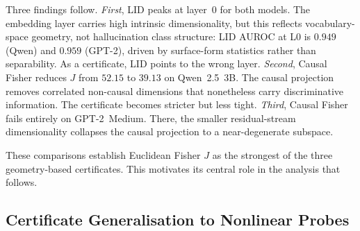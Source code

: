 \documentclass[10pt,twocolumn]{article}
\begin{document}
\begin{table}[!htbp]
\centering
\caption{Competing geometric certificates (Exp.~01). LID peaks at the
  embedding layer (L0) for both models, indicating that intrinsic
  dimensionality does not locate separability structure.
  Causal Fisher reduces $J$ by $25\%$ on Qwen and fails entirely on
  GPT-2~Medium.}
\label{tab:competing}
\small
\setlength{\tabcolsep}{3pt}
\end{table}

Three findings follow.
\textit{First}, LID peaks at layer~0 for both models. The embedding
layer carries high intrinsic dimensionality, but this reflects
vocabulary-space geometry, not hallucination class structure: LID AUROC
at L0 is $0.949$ (Qwen) and $0.959$ (GPT-2), driven by surface-form
statistics rather than separability. As a certificate, LID points to the
wrong layer.
\textit{Second}, Causal Fisher reduces $J$ from $52.15$ to $39.13$ on
Qwen~2.5~3B. The causal projection removes correlated non-causal
dimensions that nonetheless carry discriminative information. The
certificate becomes stricter but less tight.
\textit{Third}, Causal Fisher fails entirely on GPT-2~Medium. There, the
smaller residual-stream dimensionality collapses the causal projection
to a near-degenerate subspace.

These comparisons establish Euclidean Fisher $J$ as the strongest of
the three geometry-based certificates. This motivates its central role
in the analysis that follows.

\subsection{Certificate Generalisation to Nonlinear Probes}
\label{sec:mlp-probe}
\end{document}
